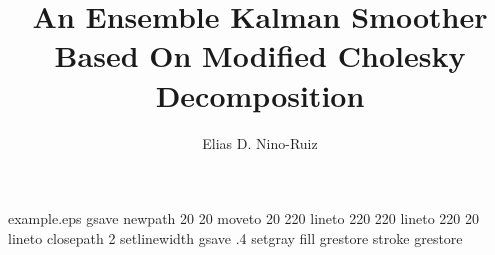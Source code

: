 %
%
%
%
%
\begin{filecontents*}{example.eps}
gsave
newpath
  20 20 moveto
  20 220 lineto
  220 220 lineto
  220 20 lineto
closepath
2 setlinewidth
gsave
  .4 setgray fill
grestore
stroke
grestore
\end{filecontents*}
%
\RequirePackage{fix-cm}
%
\documentclass[smallextended]{svjour3}       %
%
\smartqed  %
%
\usepackage{graphicx}


%
%
%
%
%


\title{An Ensemble Kalman Smoother Based On Modified Cholesky Decomposition%
}


\author{Elias D. Nino-Ruiz %
}


